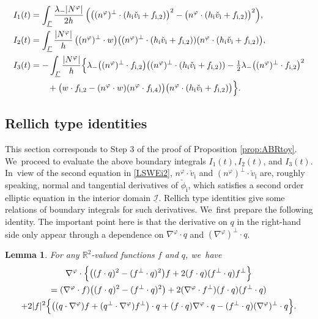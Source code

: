 \documentclass[JEP,XML,SOM,Unicode,NoFloatCountersInSection,published]{cedram}
\newcommand{\R}{{\mathbb R}}
\newcommand{\cI}{{\mathcal I}}
\newcommand{\ul}[1]{\underline{#1}}
\newcommand{\itGamma}{\mathit{\Gamma}}
\newtheorem{lemma}[theorem]{Lemma}
\theoremstyle{definition}
\begin{document}
\begin{align*}
I_1(t)
&= \int_{\ul{\itGamma}}\frac{\lambda_-|N^\varphi|}{2h}\,
\Bigl(\bigl((n^\varphi)^\perp\cdot(h_\mathrm{i}\check{v}_\mathrm{i}+f_{{\rm i},2}) \bigr)^2 - \bigl(n^\varphi\cdot(h_\mathrm{i}\check{v}_\mathrm{i}+f_{{\rm i},2}) \bigr)^2 \Bigr), \\
I_2(t)
&= \int_{\ul{\itGamma}}\frac{|N^\varphi|}{h}\,
\bigl((n^\varphi)^\perp\cdot w \bigr) \bigl((n^\varphi)^\perp\cdot(h_\mathrm{i}\check{v}_\mathrm{i}+f_{{\rm i},2}))(n^\varphi\cdot(h_\mathrm{i}\check{v}_\mathrm{i}+f_{{\rm i},2}) \bigr), \\
I_3(t)
&= -\int_{\ul{\itGamma}}\frac{|N^\varphi|}{h}\Bigl\{
\lambda_- \bigl((n^\varphi)^\perp\cdot f_{{\rm i},2} \bigr) \bigl((n^\varphi)^\perp\cdot(h_\mathrm{i}\check{v}_\mathrm{i}+f_{{\rm i},2}))
- \tfrac12\lambda_- \bigl((n^\varphi)^\perp\cdot f_{{\rm i},2} \bigr)^2 \\
&\qquad
+ \bigl(w\cdot f_{{\rm i},2} - (n^\varphi\cdot w)(n^\varphi\cdot f_{{\rm i},4}) \bigr) \bigl(n^\varphi\cdot(h_\mathrm{i}\check{v}_\mathrm{i}+f_{{\rm i},2}) \bigr) \Bigr\}.
\end{align*}

\subsection{Rellich type identities}
This section corresponds to Step 3 of the proof of Proposition \ref{prop:ABRtoy}. We~proceed to evaluate the above boundary integrals $I_1(t),I_2(t)$, and $I_3(t)$. In~view of the second equation in \eqref{LSWEi2}, $n^\varphi\cdot \check{v}_\mathrm{i}$ and $(n^\varphi)^\perp\cdot \check{v}_\mathrm{i}$ are, roughly speaking,
normal and tangential derivatives of $\check{\phi}_\mathrm{i}$, which satisfies a second order elliptic equation in the interior domain $\ul{\cI}$.
Rellich type identities give some relations of boundary integrals for such derivatives. We~first prepare the following identity.
The important point here is that the derivative on $q$ in the right-hand side only appear through a dependence on $\nabla^\varphi\cdot q$
and $(\nabla^\varphi)^\perp\cdot q$.

\begin{lemma}\label{lem:Rellich1}
For any $\R^2$-valued functions $f$ and $q$, we~have
\begin{multline*}
\nabla^\varphi\cdot\Bigl\{ \bigl((f\cdot q)^2-(f^\perp\cdot q)^2 \bigr)f + 2(f\cdot q)(f^\perp\cdot q)f^\perp \Bigr\} \\
= (\nabla^\varphi\cdot f)\bigl((f\cdot q)^2-(f^\perp\cdot q)^2 \bigr) + 2(\nabla^\varphi\cdot f^\perp)(f\cdot q)(f^\perp\cdot q) \\
+ 2|f|^2\Bigl\{ \bigl((q\cdot\nabla^\varphi)f + (q^\perp\cdot\nabla^\varphi)f^\perp \bigr)\cdot q
+ (f\cdot q)\nabla^\varphi\cdot q - (f^\perp\cdot q)(\nabla^\varphi)^\perp\cdot q \Bigr\}.
\end{multline*}
\end{lemma}
\end{document}
